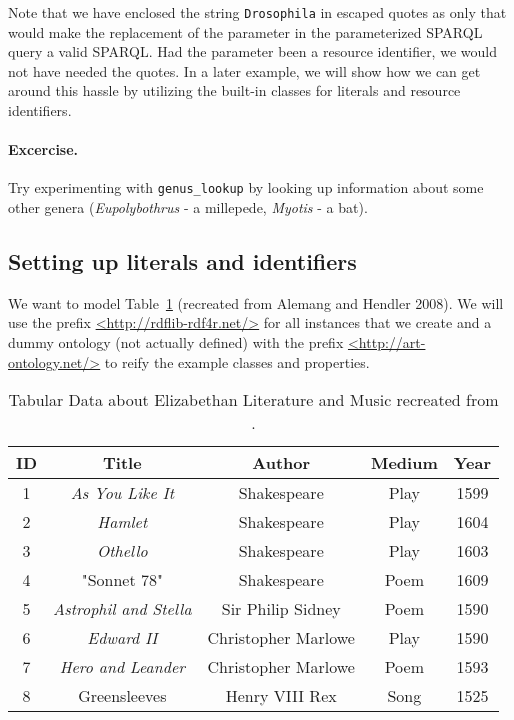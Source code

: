 Note that we have enclosed the string {\tt Drosophila} in escaped quotes as only that would make the replacement of the parameter in the parameterized SPARQL query a valid SPARQL. Had the parameter been a resource identifier, we would not have needed the quotes. In a later example, we will show how we can get around this hassle by utilizing the built-in classes for literals and resource identifiers.

\paragraph{Excercise.} Try experimenting with {\tt genus\_lookup} by looking up information about some other genera (\emph{Eupolybothrus} - a millepede, \emph{Myotis} - a bat).

\subsection{Setting up literals and identifiers}

We want to model Table~\ref{table:classical-works} (recreated from Alemang and Hendler 2008). We will use the prefix \url{<http://rdflib-rdf4r.net/>} for all instances that we create and a dummy ontology (not actually defined) with the prefix \url{<http://art-ontology.net/>} to reify the example classes and properties.

\begin{table}[h!]
\caption{Tabular Data about Elizabethan Literature and Music recreated from \cite{allemang_semantic_2011}.}
\begin{tabular}{ccccc}
\hline
 ID & Title                       & Author            & Medium & Year\\  \hline
 1  & \emph{As You Like It}       & Shakespeare       & Play & 1599\\
 2  & \emph{Hamlet}               & Shakespeare       & Play & 1604\\
 3  & \emph{Othello}              & Shakespeare       & Play & 1603\\
 4  & "Sonnet 78"                 & Shakespeare       & Poem & 1609\\
 5  & \emph{Astrophil and Stella} & Sir Philip Sidney & Poem & 1590\\
 6  & \emph{Edward II}            & Christopher Marlowe  & Play & 1590\\
 7  & \emph{Hero and Leander}     & Christopher Marlowe  & Poem & 1593\\
 8  & Greensleeves                & Henry VIII Rex       & Song & 1525
\end{tabular}
\label{table:classical-works}
\end{table}

